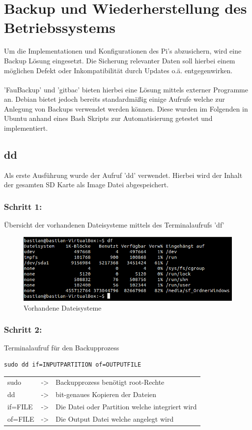 \section{Backup und Wiederherstellung des Betriebssystems}

Um die Implementationen und Konfigurationen des Pi's abzusichern, wird eine Backup Lösung eingesetzt. Die Sicherung relevanter Daten soll hierbei einem möglichen Defekt oder Inkompatibilität durch Updates o.ä. entgegenwirken.\\
\\
'FauBackup' und 'gitbac' bieten hierbei eine Lösung mittels externer Programme an. Debian bietet jedoch bereits standardmäßig einige Aufrufe welche zur Anlegung von Backups verwendet werden können. Diese wurden im Folgenden in Ubuntu anhand eines Bash Skripts zur Automatisierung getestet und implementiert.\\

\subsection{dd}
Als erste Ausführung wurde der Aufruf 'dd' verwendet. Hierbei wird der Inhalt der gesamten SD Karte als Image Datei abgespeichert.

\subsubsection*{Schritt 1:}
Übersicht der vorhandenen Dateisysteme mittels des Terminalaufrufs 'df'\\
\begin{figure}[ht]
\includegraphics[width=.8\textwidth]{pictures/Bastian/BILD1_df}
\caption{Vorhandene Dateisysteme}
\end{figure}

\subsubsection*{Schritt 2:}
Terminalaufruf für den Backupprozess
\lstset{language=bash,numbers=none,frame=single}
\begin{lstlisting}
sudo dd if=INPUTPARTITION of=OUTPUTFILE
\end{lstlisting}
\begin{tabular}{l c l}
sudo	& -> & Backupprozess benötigt root-Rechte\\
dd	& -> & bit-genaues Kopieren der Dateien\\
if=FILE	& -> & Die Datei oder Partition welche integriert wird\\
of=FILE & -> & Die Output Datei welche angelegt wird\\
\end{tabular}
\newpage %

